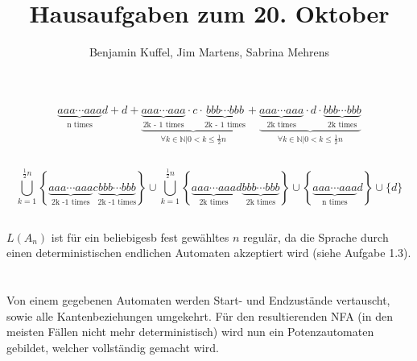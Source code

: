 \documentclass[10pt,a4paper,oneside,ngerman,numbers=noenddot]{scrartcl}
\begin{document}
\author{Benjamin Kuffel, Jim Martens, Sabrina Mehrens}
\title{Hausaufgaben zum 20. Oktober}
\maketitle

\setcounter{section}{2}
\section{} %
	\subsection{} %
	\[\underbrace{aaa \cdots aaa}_{\text{n times}}d + d + \underbrace{\underbrace{aaa \cdots aaa}_{\text{2k - 1 times}} \cdot c \cdot \underbrace{bbb \cdots bbb}_{\text{2k - 1 times}}}_{\forall k \in \mathbb{N}| 0 < k \leq \frac{1}{2}n} + \underbrace{\underbrace{aaa \cdots aaa}_{\text{2k times}} \cdot d \cdot \underbrace{bbb \cdots bbb}_{\text{2k times}}}_{\forall k \in \mathbb{N}| 0 < k \leq \frac{1}{2}n}\]
	\subsection{}
	\[\bigcup\limits_{k = 1}^{\frac{1}{2}n} \left\lbrace \underbrace{aaa \cdots aaa}_{\text{2k -1 times}} c \underbrace{bbb \cdots bbb}_{\text{2k -1 times}}\right\rbrace \cup \bigcup\limits_{k = 1}^{\frac{1}{2}n} \left\lbrace \underbrace{aaa \cdots aaa}_{\text{2k times}} d \underbrace{bbb \cdots bbb}_{\text{2k times}}\right\rbrace \cup \left\lbrace \underbrace{aaa \cdots aaa}_{\text{n times}}d\right\rbrace \cup \{d\}\]
	\subsection{}
	\subsection{}
	\(L(A_{n})\) ist für ein beliebigesb fest gewähltes \(n\) regulär, da die Sprache durch einen deterministischen endlichen Automaten akzeptiert wird (siehe Aufgabe 1.3).
\section{} %
	\subsection{}
	Von einem gegebenen Automaten werden Start- und Endzustände vertauscht, sowie alle Kantenbeziehungen umgekehrt. Für den resultierenden NFA (in den meisten Fällen nicht mehr deterministisch) wird nun ein Potenzautomaten gebildet, welcher vollständig gemacht wird.
\end{document}
